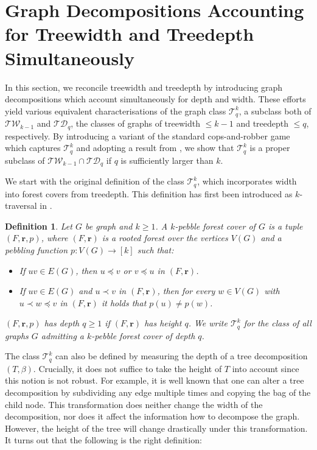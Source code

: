 \documentclass[10pt,a4paper]{article}
\newtheorem{definition}[theorem]{Definition}
\newcommand{\Ekq}{\ensuremath{\mathcal{T}_{q}^{k}}}
\renewcommand{\vec}[1]{\ensuremath{\boldsymbol{#1}}}
\begin{document}
 
\section{Graph Decompositions Accounting for Treewidth and Treedepth Simultaneously}
\label{sec:graph-dec}
In this section, we reconcile treewidth and treedepth by introducing graph decompositions which account simultaneously for depth and width.
These efforts yield various equivalent characterisations of the graph class $\Ekq$, a subclass both of $\mathcal{TW}_{k-1}$ and $\mathcal{TD}_q$, the classes of graphs of treewidth $\leq k -1$ and treedepth $\leq q$, respectively.
By introducing a variant of the standard cops-and-robber game which captures $\Ekq$ and adopting a result from \cite{Furer01}, we show that $\Ekq$ is a proper subclass of $\mathcal{TW}_{k-1} \cap \mathcal{TD}_q$ if $q$ is sufficiently larger than $k$.

We start with the original definition of the class \Ekq, which incorporates width into forest covers from treedepth.
This definition has first been introduced as $k$-traversal in \cite{AbramskyDW17}.

\begin{definition} \label{def:kpebbleforest}
	Let $G$ be  graph and $k\geq 1$.
	A \emph{$k$-pebble forest cover} of $G$ is a tuple $(F,\vec{r},p)$, where $(F,\vec{r})$ is a rooted forest over the vertices $V(G)$ and a pebbling function $p\colon V(G)\rightarrow [k]$ such that:
	\begin{itemize}
		\item If $uv\in E(G)$, then $u\preceq v$ or $v\preceq u$ in $(F,\vec{r})$.
		\item If $uv \in E(G)$ and $u\prec v$ in $(F,\vec{r})$, then for every $w\in V(G)$ with $u\prec w\preceq v$ in $(F,\vec{r})$ it holds that $p(u)\neq p(w)$.
	\end{itemize}
	$(F,\vec{r},p)$ has depth $q\geq 1$ if $(F,\vec{r})$ has height $q$.
	We write $\Ekq$ for the class of all graphs $G$ admitting a $k$-pebble forest cover of depth $q$.
\end{definition}

The class $\Ekq$ can also be defined by measuring the depth of a tree decomposition $(T, \beta)$.
Crucially, it does not suffice to take the height of $T$ into account since this notion is not robust.
For example, it is well known that one can alter a tree decomposition by subdividing any edge multiple times and copying the bag of the child node.
This transformation does neither change the width of the decomposition, nor does it affect the information how to decompose the graph. However, the height of the tree will change drastically under this transformation.
It turns out that the following is the right definition:
\end{document}
